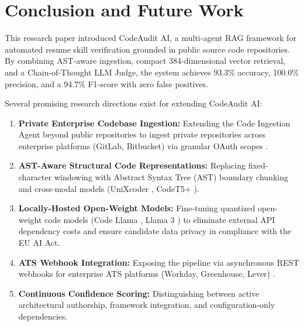 \documentclass[conference]{IEEEtran}
\begin{document}
\section{Conclusion and Future Work}

This research paper introduced CodeAudit AI, a multi-agent RAG framework for automated resume skill verification grounded in public source code repositories. By combining AST-aware ingestion, compact 384-dimensional vector retrieval, and a Chain-of-Thought LLM Judge, the system achieves 93.3\% accuracy, 100.0\% precision, and a 94.7\% F1-score with zero false positives.

Several promising research directions exist for extending CodeAudit AI:
\begin{enumerate}
    \item \textbf{Private Enterprise Codebase Ingestion:} Extending the Code Ingestion Agent beyond public repositories to ingest private repositories across enterprise platforms (GitLab, Bitbucket) via granular OAuth scopes \cite{kalliamvakou2014github, githubapi2023}.
    \item \textbf{AST-Aware Structural Code Representations:} Replacing fixed-character windowing with Abstract Syntax Tree (AST) boundary chunking and cross-modal models (UniXcoder \cite{guo2022unixcoder}, CodeT5+ \cite{wang2023codet5}).
    \item \textbf{Locally-Hosted Open-Weight Models:} Fine-tuning quantized open-weight code models (Code Llama \cite{roziere2023codellama}, Llama 3 \cite{dubey2024llama3}) to eliminate external API dependency costs and ensure candidate data privacy in compliance with the EU AI Act.
    \item \textbf{ATS Webhook Integration:} Exposing the pipeline via asynchronous REST webhooks for enterprise ATS platforms (Workday, Greenhouse, Lever) \cite{jayaratne2022systematic}.
    \item \textbf{Continuous Confidence Scoring:} Distinguishing between active architectural authorship, framework integration, and configuration-only dependencies.
\end{enumerate}
\end{document}
